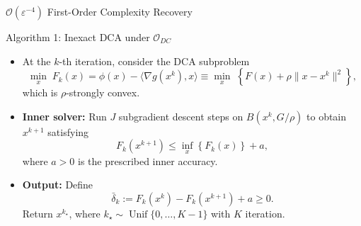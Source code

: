 \documentclass[10pt]{beamer}
\begin{document}
\begin{frame}{$\mathcal O(\varepsilon^{-4})$ First-Order Complexity Recovery}
\footnotesize

\begin{block}{Algorithm 1: Inexact DCA under $\mathcal O_{DC}$}
\begin{itemize}\setlength{\itemsep}{3pt}

    \item At the $k$-th iteration, consider the DCA subproblem
    \[
        \min_x\; F_{k}(x) = 
        \phi(x)-\langle\nabla g(x^k),x\rangle
        \equiv
        \min_x\;
        \left\{
        F(x)+\rho\|x-x^k\|^2
        \right\},
    \]
    which is $\rho$-strongly convex.

    \item \textbf{Inner solver:} Run $J$ subgradient descent steps on
    $B(x^k,G/\rho)$ to obtain $x^{k+1}$ satisfying
    \[
         F_{k}(x^{k+1})
        \le
        \inf_x\left\{
           F_{k}(x) 
        \right\}+a,
    \]
    where $a>0$ is the prescribed inner accuracy.

    \item \textbf{Output:} Define
    \[
        \bar\delta_k:=F_k(x^k)-F_k(x^{k+1})+a\ge0.
    \]
    Return $x^{k_\star}$, where
    $k_\star\sim\operatorname{Unif}\{0,\ldots,K-1\}$ with $K$ iteration.

\end{itemize}
\end{block}
    

    
\end{frame}
\end{document}
